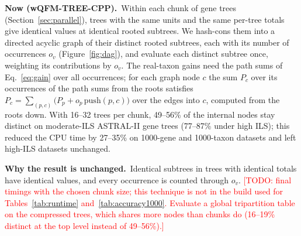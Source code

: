 \documentclass[11pt,a4paper]{article}
\newcommand{\todo}[1]{\textcolor{red}{[TODO: #1]}}
\newcommand{\cpp}{wQFM-TREE-CPP}
\newcommand{\Now}{\par\smallskip\noindent\textbf{\textcolor{nowc}{Now (\cpp).}}\ }
\newcommand{\Exact}{\par\smallskip\noindent\textbf{Why the result is unchanged.}\ }
\begin{document}
\Now Within each chunk of gene trees (Section~\ref{sec:parallel}), trees with the same units and the
same per-tree totals give identical values at identical rooted subtrees. We hash-cons them into a
directed acyclic graph of their distinct rooted subtrees, each with its number of occurrences $o_v$
(Figure~\ref{fig:dag}), and evaluate each distinct subtree once, weighting its contributions by $o_v$.
The real-taxon gains need the path sums of Eq.~\eqref{eq:gain} over all occurrences; for each
graph node $c$ the sum $P_c$ over its occurrences of the path sums from the roots satisfies
$P_c=\sum_{(p,c)}\bigl(P_p+o_p\,\mathrm{push}(p,c)\bigr)$ over the edges into $c$, computed from the
roots down. With 16--32 trees per chunk, 49--56\% of the internal nodes stay distinct on
moderate-ILS ASTRAL-II gene trees (77--87\% under high ILS); this reduced the CPU time by
27--35\% on 1000-gene and 1000-taxon datasets and left high-ILS datasets unchanged.

\Exact Identical subtrees in trees with identical totals have identical values, and every
occurrence is counted through $o_v$. \todo{final timings with the chosen chunk size; this technique
is not in the build used for Tables~\ref{tab:runtime} and~\ref{tab:accuracy1000}. Evaluate a
global tripartition table on the compressed trees, which shares more nodes than chunks do (16--19\%
distinct at the top level instead of 49--56\%).}
\end{document}
